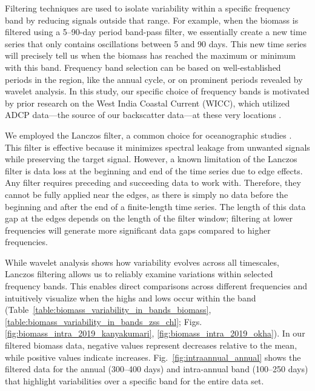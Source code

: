 \documentclass[12pt,a4paper]{article}
\begin{document}
Filtering techniques are used to isolate variability within a specific frequency band by reducing signals outside that range. For example, when the biomass is filtered using a 5--90-day period band-pass filter, we essentially create a new time series that only contains oscillations between 5 and 90 days. This new time series will precisely tell us when the biomass has reached the maximum or minimum with this band.
Frequency band selection can be based on well-established periods in the region, like the annual cycle, or on prominent periods revealed by wavelet analysis. In this study, our specific choice of frequency bands is motivated by prior research on the West India Coastal Current (WICC), which utilized ADCP data—the source of our backscatter data—at these very locations \citep{amol2014observed, chaudhuri2020observed, chaudhuri2021observed}.


We employed the Lanczos filter, a common choice for oceanographic studies \citep{duchon1979lanczos}. This filter is effective because it minimizes spectral leakage from unwanted signals while preserving the target signal. However, a known limitation of the Lanczos filter is data loss at the beginning and end of the time series due to edge effects. Any filter requires preceding and succeeding data to work with. Therefore, they cannot be fully applied near the edges, as there is simply no data before the beginning and after the end of a finite-length time series. The length of this data gap at the edges depends on the length of the filter window; filtering at lower frequencies will generate more significant data gaps compared to higher frequencies.



While wavelet analysis shows how variability evolves across all timescales, Lanczos filtering allows us to reliably examine variations within selected frequency bands. This enables direct comparisons across different frequencies and intuitively visualize when the highs and lows occur within the band (Table~\ref{table:biomass_variability_in_bands_biomass}, \ref{table:biomass_variability_in_bands_zss_chl}; Figs.\ref{fig:biomass_intra_2019_kanyakumari}, \ref{fig:biomass_intra_2019_okha}).
In our filtered biomass data, negative values represent decreases relative to the mean, while positive values indicate increases. Fig.~\ref{fig:intraannual_annual} shows the filtered data for the annual (300--400 days) and intra-annual band (100--250 days) that highlight variabilities over a specific band for the entire data set.
\end{document}
